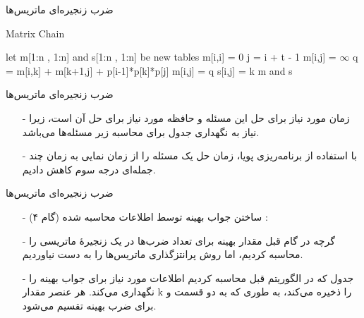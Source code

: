 \begin{frame}{‌ضرب زنجیره‌ای ماتریس‌ها}
\begin{algorithm}[H]\alglr
  \caption{Matrix Chain} 
  \begin{algorithmic}[1]
     \State let m[1:n , 1:n] and s[1:n , 1:n] be new tables
      
     	\State m[i,i] = 0 
     \EndFor
      
          
         \State j = i + t - 1 
         \State m[i,j] = $\infty$
          
         			\State q = m[i,k] + m[k+1,j] + p[i-1]*p[k]*p[j]
         				\State m[i,j] = q 
         				\State s[i,j] = k  
         			\EndIf
         	\EndFor
         \EndFor
      \EndFor
  \State \Return m and s            
  \end{algorithmic}
  \label{alg:merge}
\end{algorithm}
\end{frame}


\begin{frame}{‌ضرب زنجیره‌ای ماتریس‌ها}
\begin{itemize}\itemr
\item[-]
زمان مورد نیاز برای حل این مسئله
و حافظه مورد نیاز برای حل آن
است، زیرا نیاز به نگهداری جدول برای محاسبه زیر مسئله‌ها می‌باشد.
\item[-]
با استفاده از برنامه‌ریزی پویا، زمان حل یک مسئله را از زمان نمایی به زمان چند جمله‌ای درجه سوم کاهش دادیم.
\end{itemize}
\end{frame}


\begin{frame}{‌ضرب زنجیره‌ای ماتریس‌ها}
\begin{itemize}\itemr
\item[-]
(گام ۴) ساختن جواب بهینه توسط اطلاعات محاسبه شده :
\item[-]
گرچه در گام قبل مقدار بهینه برای تعداد ضرب‌ها در یک زنجیرهٔ ماتریسی را محاسبه کردیم، اما روش پرانتزگذاری ماتریس‌ها را به دست نیاوردیم.
\item[-]
جدول
که در الگوریتم قبل محاسبه کردیم اطلاعات مورد نیاز برای جواب بهینه را نگهداری می‌کند. هر عنصر
مقدار k را ذخیره می‌کند، به طوری که
به دو قسمت
و
برای ضرب بهینه تقسیم می‌شود.
\end{itemize}
\end{frame}


